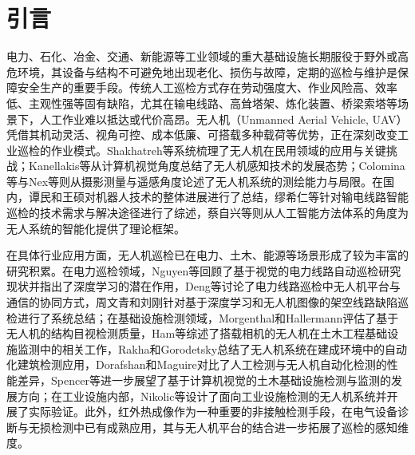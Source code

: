 \section{引言}

电力、石化、冶金、交通、新能源等工业领域的重大基础设施长期服役于野外或高危环境，其设备与结构不可避免地出现老化、损伤与故障，定期的巡检与维护是保障安全生产的重要手段。传统人工巡检方式存在劳动强度大、作业风险高、效率低、主观性强等固有缺陷，尤其在输电线路、高耸塔架、炼化装置、桥梁索塔等场景下，人工作业难以抵达或代价高昂。无人机（Unmanned Aerial Vehicle, UAV）凭借其机动灵活、视角可控、成本低廉、可搭载多种载荷等优势，正在深刻改变工业巡检的作业模式\cite{shakhatreh2019survey,floreano2015science,kumar2012opportunities,cai2014survey,kendoul2012survey}。Shakhatreh等\cite{shakhatreh2019survey}系统梳理了无人机在民用领域的应用与关键挑战；Kanellakis等\cite{kanellakis2017survey}从计算机视觉角度总结了无人机感知技术的发展态势；Colomina等\cite{colomina2014unmanned}与Nex等\cite{nex2014uav}则从摄影测量与遥感角度论述了无人机系统的测绘能力与局限。在国内，谭民和王硕\cite{tanm2013robot}对机器人技术的整体进展进行了总结，缪希仁等\cite{miao2020uav}针对输电线路智能巡检的技术需求与解决途径进行了综述，蔡自兴等\cite{caizx2016artificial}则从人工智能方法体系的角度为无人系统的智能化提供了理论框架。

在具体行业应用方面，无人机巡检已在电力、土木、能源等场景形成了较为丰富的研究积累。在电力巡检领域，Nguyen等\cite{nguyen2018automatic}回顾了基于视觉的电力线路自动巡检研究现状并指出了深度学习的潜在作用，Deng等\cite{deng2014unmanned}讨论了电力线路巡检中无人机平台与通信的协同方式，周文青和刘刚\cite{zhouwq2024review}针对基于深度学习和无人机图像的架空线路缺陷巡检进行了系统总结；在基础设施检测领域，Morgenthal和Hallermann\cite{morgenthal2014quality}评估了基于无人机的结构目视检测质量，Ham等\cite{ham2016visual}综述了搭载相机的无人机在土木工程基础设施监测中的相关工作，Rakha和Gorodetsky总结了无人机系统在建成环境中的自动化建筑检测应用，Dorafshan和Maguire\cite{dorafshan2018bridge}对比了人工检测与无人机自动化检测的性能差异，Spencer等\cite{spencer2019advances}进一步展望了基于计算机视觉的土木基础设施检测与监测的发展方向；在工业设施内部，Nikolic等\cite{nikolic2013uav}设计了面向工业设施检测的无人机系统并开展了实际验证。此外，红外热成像作为一种重要的非接触检测手段，在电气设备诊断\cite{jadin2012recent}与无损检测\cite{usamentiaga2014infrared}中已有成熟应用，其与无人机平台的结合进一步拓展了巡检的感知维度。

